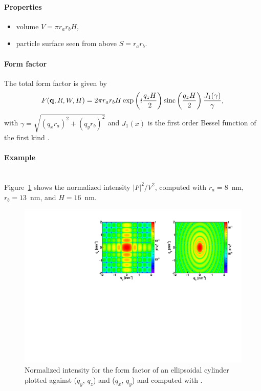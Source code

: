\paragraph{Properties}
\begin{itemize}
\item volume $V = \pi r_a r_bH$,
\item particle surface seen from above $S = r_a r_b$.
\end{itemize}

\paragraph{Form factor}
The total form factor is given by 
\begin{equation*}
F(\mathbf{q},R,W,H) = 2\pi r_a r_b H \exp\left(i\frac{q_z
  H}{2}\right)\operatorname{sinc}\left(\frac{q_z H}{2}\right) \frac{J_1(\gamma)}{\gamma},
\end{equation*}
with $\gamma=\sqrt{(q_x r_a)^2+(q_y r_b)^2}$ and $J_1(x)$ is the first order
Bessel function of the first kind \cite{AbSt64}.


\paragraph{Example}\strut\\
Figure~\ref{fig:FFellipscylinderEx} shows the normalized intensity
$|F|^2/V^2$, computed with $r_a=8$~nm, $r_b=13$~nm, and $H=16$~nm.
\begin{figure}[h]
\begin{center}
\includegraphics[angle=-90,width=\textwidth]{fig/ff/figffellipscylinder.pdf}
\end{center}
\caption{Normalized intensity for the form factor of an ellipsoidal
  cylinder plotted against ($q_y$, $q_z$) and ($q_x$,
  $q_y$) and computed with .}
\label{fig:FFellipscylinderEx}
\end{figure}

